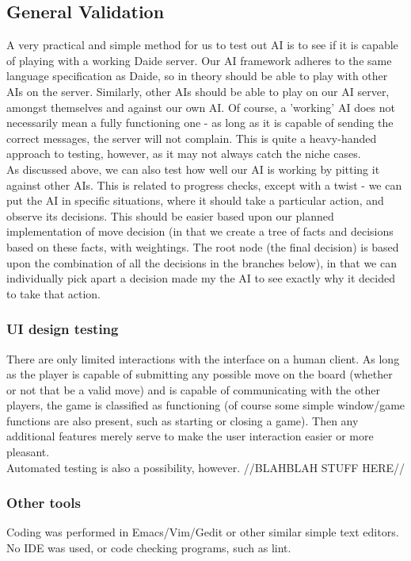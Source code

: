\documentclass[12pt]{article}
\begin{document}
\subsection{General Validation}
A very practical and simple method for us to test out AI is to see if it is capable of playing with a working Daide server. Our AI framework adheres to the same language specification as Daide, so in theory should be able to play with other AIs on the server. Similarly, other AIs should be able to play on our AI server, amongst themselves and against our own AI. Of course, a 'working' AI does not necessarily mean a fully functioning one - as long as it is capable of sending the correct messages, the server will not complain. This is quite a heavy-handed approach to testing, however, as it may not always catch the niche cases.
\\
As discussed above, we can also test how well our AI is working by pitting it against other AIs. This is related to progress checks, except with a twist - we can put the AI in specific situations, where it should take a particular action, and observe its decisions. This should be easier based upon our planned implementation of move decision (in that we create a tree of facts and decisions based on these facts, with weightings. The root node (the final decision) is based upon the combination of all the decisions in the branches below), in that we can individually pick apart a decision made my the AI to see exactly why it decided to take that action.

\subsubsection{UI design testing}
There are only limited interactions with the interface on a human client. As long as the player is capable of submitting any possible move on the board (whether or not that be a valid move) and is capable of communicating with the other players, the game is classified as functioning (of course some simple window/game functions are also present, such as starting or closing a game). Then any additional features merely serve to make the user interaction easier or more pleasant.
\\
Automated testing is also a possibility, however. //BLAHBLAH STUFF HERE//

\subsubsection{Other tools}
Coding was performed in Emacs/Vim/Gedit or other similar simple text editors. No IDE was used, or code checking programs, such as lint.
\end{document}
